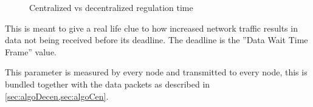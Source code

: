 \begin{figure}[b]
	\centering
	{}
	
	\newline
	
	{}
	
	\caption{Centralized vs decentralized regulation time}
\end{figure}


This is meant to give a real life clue to how increased network traffic results in data not being received before its deadline. The deadline is the ''Data Wait Time Frame'' value.

This parameter is measured by every node and transmitted to every node, this is bundled together with the data packets as described in \cref{sec:algoDecen,sec:algoCen}.


